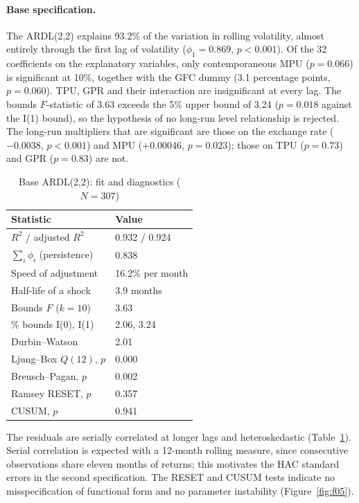\documentclass[10pt,twocolumn,a4paper]{article}
\begin{document}
\paragraph{Base specification.} The ARDL(2,2) explains 93.2\% of the variation in rolling volatility, almost entirely through the first lag of volatility ($\phi_1=0.869$, $p<0.001$). Of the 32 coefficients on the explanatory variables, only contemporaneous MPU ($p=0.066$) is significant at 10\%, together with the GFC dummy (3.1 percentage points, $p=0.060$). TPU, GPR and their interaction are insignificant at every lag. The bounds $F$-statistic of 3.63 exceeds the 5\% upper bound of 3.24 ($p=0.018$ against the I(1) bound), so the hypothesis of no long-run level relationship is rejected. The long-run multipliers that are significant are those on the exchange rate ($-0.0038$, $p<0.001$) and MPU ($+0.00046$, $p=0.023$); those on TPU ($p=0.73$) and GPR ($p=0.83$) are not.

\begin{table}[htbp]\centering\footnotesize
\caption{Base ARDL(2,2): fit and diagnostics ($N=307$)}\label{tab:ardlbase}
\begin{tabular}{ll}
\toprule
Statistic & Value \\
\midrule
$R^2$ / adjusted $R^2$ & 0.932 / 0.924 \\
$\sum_i\phi_i$ (persistence) & 0.838 \\
Speed of adjustment & 16.2\% per month \\
Half-life of a shock & 3.9 months \\
Bounds $F$ ($k=10$) & 3.63 \\
\quad 5\% bounds I(0), I(1) & 2.06, 3.24 \\
Durbin--Watson & 2.01 \\
Ljung--Box $Q(12)$, $p$ & 0.000 \\
Breusch--Pagan, $p$ & 0.002 \\
Ramsey RESET, $p$ & 0.357 \\
CUSUM, $p$ & 0.941 \\
\bottomrule
\end{tabular}
\end{table}

The residuals are serially correlated at longer lags and heteroskedastic (Table~\ref{tab:ardlbase}). Serial correlation is expected with a 12-month rolling measure, since consecutive observations share eleven months of returns; this motivates the HAC standard errors in the second specification. The RESET and CUSUM tests indicate no misspecification of functional form and no parameter instability (Figure~\ref{fig:f05}).
\end{document}
